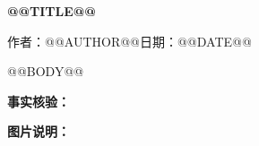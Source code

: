 \documentclass[UTF8,zihao=-4,fontset=none]{ctexart}
\begin{document}
\begin{center}
  {\bfseries @@TITLE@@\par}
  \vspace{0.8em}
  {作者：@@AUTHOR@@\quad 日期：@@DATE@@}
\end{center}
\vspace{1em}

@@BODY@@

\vspace{1em}
\noindent\textbf{事实核验：}
\par\noindent\textbf{图片说明：}
\end{document}
